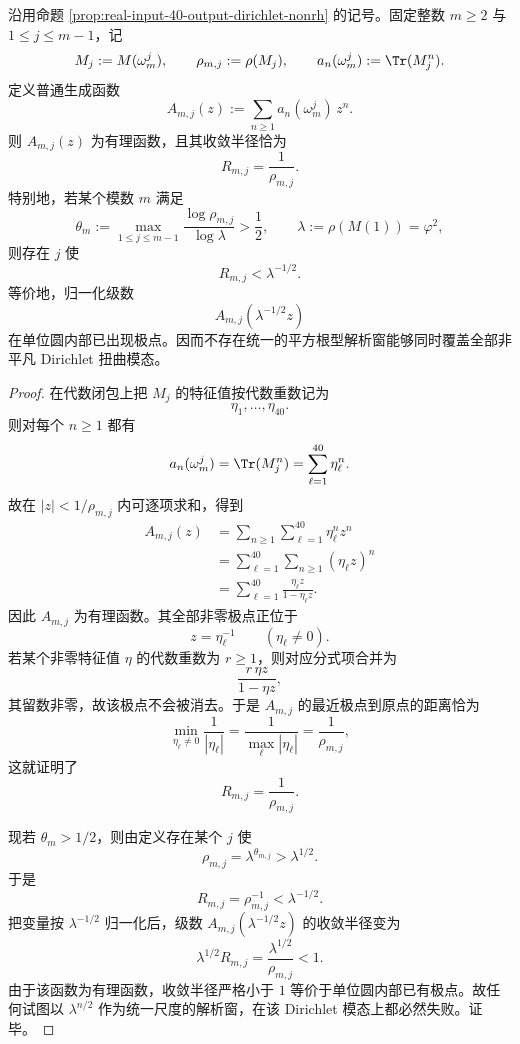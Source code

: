 \begin{theorem}\label{thm:xi-output-potential-dirichlet-fourier-radius-barrier}
沿用命题 \ref{prop:real-input-40-output-dirichlet-nonrh} 的记号。固定整数 \(m\ge 2\) 与 \(1\le j\le m-1\)，记
\[
M_j:=M(\omega_m^j),
\qquad
\rho_{m,j}:=\rho(M_j),
\qquad
a_n(\omega_m^j):=\Tr(M_j^n).
\]
定义普通生成函数
\[
A_{m,j}(z):=\sum_{n\ge 1}a_n(\omega_m^j)\,z^n.
\]
则 \(A_{m,j}(z)\) 为有理函数，且其收敛半径恰为
\[
\boxed{\;R_{m,j}=\frac{1}{\rho_{m,j}}.\;}
\]
特别地，若某个模数 \(m\) 满足
\[
\theta_m:=\max_{1\le j\le m-1}\frac{\log\rho_{m,j}}{\log\lambda}>\frac12,
\qquad
\lambda:=\rho(M(1))=\varphi^2,
\]
则存在 \(j\) 使
\[
R_{m,j}<\lambda^{-1/2}.
\]
等价地，归一化级数
\[
A_{m,j}(\lambda^{-1/2}z)
\]
在单位圆内部已出现极点。因而不存在统一的平方根型解析窗能够同时覆盖全部非平凡 Dirichlet 扭曲模态。
\end{theorem}
\begin{proof}
在代数闭包上把 \(M_j\) 的特征值按代数重数记为
\[
\eta_1,\dots,\eta_{40}.
\]
则对每个 \(n\ge 1\) 都有
\[
a_n(\omega_m^j)=\Tr(M_j^n)=\sum_{\ell=1}^{40}\eta_\ell^n.
\]
故在 \(|z|<1/\rho_{m,j}\) 内可逐项求和，得到
\[
\begin{aligned}
A_{m,j}(z)
&=
\sum_{n\ge 1}\sum_{\ell=1}^{40}\eta_\ell^n z^n\\
&=
\sum_{\ell=1}^{40}\sum_{n\ge 1}(\eta_\ell z)^n\\
&=
\sum_{\ell=1}^{40}\frac{\eta_\ell z}{1-\eta_\ell z}.
\end{aligned}
\]
因此 \(A_{m,j}\) 为有理函数。其全部非零极点正位于
\[
z=\eta_\ell^{-1}
\qquad(\eta_\ell\neq 0).
\]
若某个非零特征值 \(\eta\) 的代数重数为 \(r\ge 1\)，则对应分式项合并为
\[
\frac{r\,\eta z}{1-\eta z},
\]
其留数非零，故该极点不会被消去。于是 \(A_{m,j}\) 的最近极点到原点的距离恰为
\[
\min_{\eta_\ell\neq 0}\frac{1}{|\eta_\ell|}
=
\frac{1}{\max_\ell|\eta_\ell|}
=
\frac{1}{\rho_{m,j}},
\]
这就证明了
\[
R_{m,j}=\frac{1}{\rho_{m,j}}.
\]

现若 \(\theta_m>1/2\)，则由定义存在某个 \(j\) 使
\[
\rho_{m,j}=\lambda^{\theta_{m,j}}
>
\lambda^{1/2}.
\]
于是
\[
R_{m,j}=\rho_{m,j}^{-1}<\lambda^{-1/2}.
\]
把变量按 \(\lambda^{-1/2}\) 归一化后，级数 \(A_{m,j}(\lambda^{-1/2}z)\) 的收敛半径变为
\[
\lambda^{1/2}R_{m,j}=\frac{\lambda^{1/2}}{\rho_{m,j}}<1.
\]
由于该函数为有理函数，收敛半径严格小于 \(1\) 等价于单位圆内部已有极点。故任何试图以 \(\lambda^{n/2}\) 作为统一尺度的解析窗，在该 Dirichlet 模态上都必然失败。证毕。
\end{proof}

\endinput
